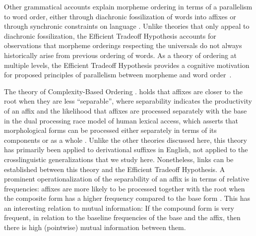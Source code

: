 \documentclass[11pt,letterpaper]{article}
\newcommand{\citep}{\parencite}
\newcommand{\citet}{\Textcite}
\newcommand\mhahn[1]{{\color{red}(#1)}}
\begin{document}





Other grammatical accounts explain morpheme ordering in terms of a parallelism to word order, either through diachronic fossilization of words into affixes or through synchronic constraints on language \citep{givon1971historical,venneman1973explanation,baker1985the}.
Unlike theories that only appeal to diachronic fossilization, the Efficient Tradeoff Hypothesis accounts for observations that morpheme orderings respecting the universals do not always historically arise from previous ordering of words.
As a theory of ordering at multiple levels, the Efficient Tradeoff Hypothesis  provides a cognitive motivation for proposed principles of parallelism between morpheme and word order~\citep{baker1985the}.



The theory of Complexity-Based Ordering \citep{hay2002speech,plag2002the,hay2004what,hay2005shifting,plag2009suffix}.
holds that affixes are closer to the root when they are less ``separable'', where separability indicates the productivity of an affix and the likelihood that affixes are processed separately with the base in the dual processing race model of human lexical access, which asserts that morphological forms can be processed either separately in terms of its components or as a whole  \citep{baayen1993on}.
Unlike the other theories discussed here, this theory has primarily been applied to derivational suffixes in English, not applied to the crosslinguistic generalizations that we study here.
Nonetheless, links can be established between this theory and the Efficient Tradeoff Hypothesis.
A prominent operationalization of the separability of an affix is in terms of relative frequencies:
affixes are more likely to be processed together with the root when the composite form has a higher frequency compared to the base form \citep{hay2001lexical}. %
This has an interesting relation to mutual information: 
If the compound form is very frequent, in relation to the baseline frequencies of the base and the affix, then there is high (pointwise) mutual information between them.
\end{document}
